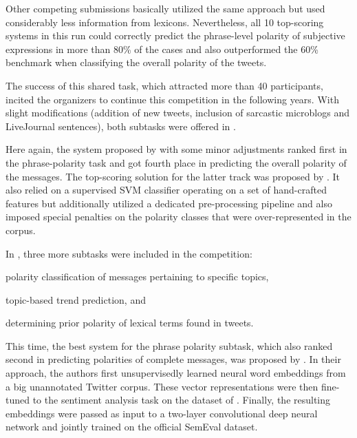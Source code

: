 Other competing submissions \cite{Becker:13,Guenther:13,Kokciyan:13}
basically utilized the same approach but used considerably less
information from lexicons.  Nevertheless, all 10 top-scoring systems
in this run could correctly predict the phrase-level polarity of
subjective expressions in more than 80\% of the cases and also
outperformed the 60\% benchmark when classifying the overall polarity
of the tweets.

The success of this shared task, which attracted more than 40
participants, incited the organizers to continue this competition in
the following years.  With slight modifications (addition of new
tweets, inclusion of sarcastic microblogs and LiveJournal sentences),
both subtasks were offered in \citeyear{Rosenthal:14}
\cite[cf.][]{Rosenthal:14}.

Here again, the system proposed by \citet{Mohammad:13} with some minor
adjustments \cite{Zhu:14} ranked first in the phrase-polarity task and
got fourth place in predicting the overall polarity of the messages.
The top-scoring solution for the latter track was proposed by
\citet{Miura:14}.  It also relied on a supervised SVM classifier
operating on a set of hand-crafted features but additionally utilized
a dedicated pre-processing pipeline and also imposed special penalties
on the polarity classes that were over-represented in the corpus.

In \citeyear{Rosenthal:15}, three more subtasks were included in the
competition:
\begin{inparaenum}
  \item polarity classification of messages pertaining to specific
    topics,
  \item topic-based trend prediction, and
  \item determining prior polarity of lexical terms found in tweets.
\end{inparaenum}

This time, the best system for the phrase polarity subtask, which also
ranked second in predicting polarities of complete messages, was
proposed by \citet{Severyn:15}.  In their approach, the authors first
unsupervisedly learned neural word embeddings from a big unannotated
Twitter corpus.  These vector representations were then fine-tuned to
the sentiment analysis task on the dataset of \citet{Go:09}.  Finally,
the resulting embeddings were passed as input to a two-layer
convolutional deep neural network and jointly trained on the official
SemEval dataset.

